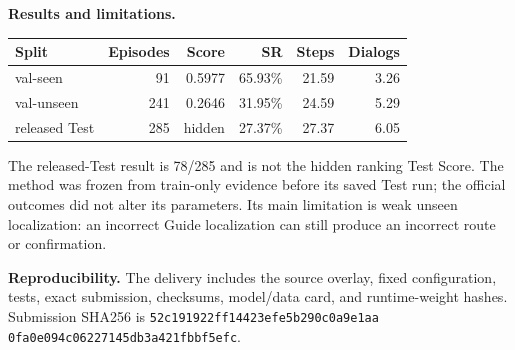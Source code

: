 \documentclass[9pt,a4paper]{article}
\newcommand{\sect}[1]{\vspace{2pt}\textbf{#1}\quad}
\begin{document}
\sect{Results and limitations.}
\begin{center}
\small
\begin{tabular}{lrrrrr}
\toprule
Split & Episodes & Score & SR & Steps & Dialogs \\
\midrule
val-seen & 91 & 0.5977 & 65.93\% & 21.59 & 3.26 \\
val-unseen & 241 & 0.2646 & 31.95\% & 24.59 & 5.29 \\
released Test & 285 & hidden & 27.37\% & 27.37 & 6.05 \\
\bottomrule
\end{tabular}
\end{center}
\vspace{-3pt}
The released-Test result is 78/285 and is not the hidden ranking Test Score.
The method was frozen from train-only evidence before its saved Test run; the
official outcomes did not alter its parameters. Its main limitation is weak
unseen localization: an incorrect Guide localization can still produce an
incorrect route or confirmation.

\sect{Reproducibility.}
The delivery includes the source overlay, fixed configuration, tests, exact
submission, checksums, model/data card, and runtime-weight hashes. Submission
SHA256 is \texttt{52c191922ff14423efe5b290c0a9e1aa}\\[-1pt]
\texttt{0fa0e094c06227145db3a421fbbf5efc}.
\end{document}
